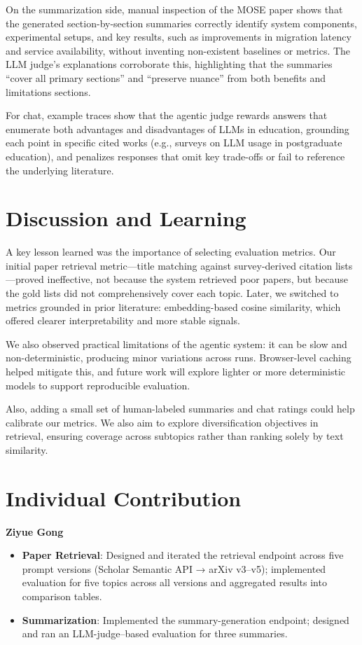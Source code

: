 \documentclass{article}
\begin{document}
On the summarization side, manual inspection of the MOSE paper shows that the generated section-by-section summaries correctly identify system components, experimental setups, and key results, such as improvements in migration latency and service availability, without inventing non-existent baselines or metrics.
The LLM judge's explanations corroborate this, highlighting that the summaries ``cover all primary sections'' and ``preserve nuance'' from both benefits and limitations sections.

For chat, example traces show that the agentic judge rewards answers that enumerate both advantages and disadvantages of LLMs in education, grounding each point in specific cited works (e.g., surveys on LLM usage in postgraduate education), and penalizes responses that omit key trade-offs or fail to reference the underlying literature.

\section{Discussion and Learning}

A key lesson learned was the importance of selecting evaluation metrics. Our initial paper retrieval metric—title matching against survey-derived citation lists—proved ineffective, not because the system retrieved poor papers, but because the gold lists did not comprehensively cover each topic. Later, we switched to metrics grounded in prior literature: embedding-based cosine similarity, which offered clearer interpretability and more stable signals.

We also observed practical limitations of the agentic system: it can be slow and non-deterministic, producing minor variations across runs. Browser-level caching helped mitigate this, and future work will explore lighter or more deterministic models to support reproducible evaluation.

Also, adding a small set of human-labeled summaries and chat ratings could help calibrate our metrics. We also aim to explore diversification objectives in retrieval, ensuring coverage across subtopics rather than ranking solely by text similarity. 


\section{Individual Contribution}
\textbf{Ziyue Gong}
\begin{itemize}
    \item \textbf{Paper Retrieval}: Designed and iterated the retrieval endpoint across five prompt versions (Scholar Semantic API → arXiv v3–v5); implemented evaluation for five topics across all versions and aggregated results into comparison tables.

    \item \textbf{Summarization}: Implemented the summary-generation endpoint; designed and ran an LLM-judge–based evaluation for three summaries.
\end{itemize}
\end{document}
